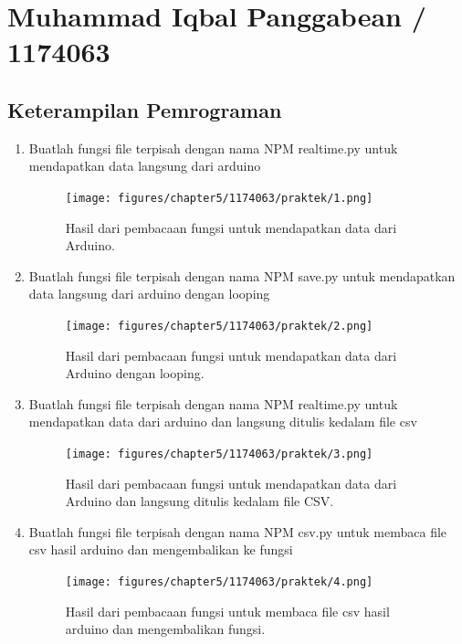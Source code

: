 \section{Muhammad Iqbal Panggabean / 1174063}
\subsection{Keterampilan Pemrograman}
\begin{enumerate}
	\item Buatlah fungsi file terpisah dengan nama NPM realtime.py untuk mendapatkan data langsung dari arduino
	

	\begin{figure}[H]
		\texttt{[image: figures/chapter5/1174063/praktek/1.png]}
		\centering
		\caption{Hasil dari pembacaan fungsi untuk mendapatkan data dari Arduino.}
	\end{figure}
	
	\item Buatlah fungsi file terpisah dengan nama NPM save.py untuk mendapatkan data langsung dari arduino dengan looping
	

	\begin{figure}[H]
		\texttt{[image: figures/chapter5/1174063/praktek/2.png]}
		\centering
		\caption{Hasil dari pembacaan fungsi untuk mendapatkan data dari Arduino dengan looping.}
	\end{figure}
	
	\item Buatlah fungsi file terpisah dengan nama NPM realtime.py untuk mendapatkan data dari arduino dan langsung ditulis kedalam file csv
	

	\begin{figure}[H]
		\texttt{[image: figures/chapter5/1174063/praktek/3.png]}
		\centering
		\caption{Hasil dari pembacaan fungsi untuk mendapatkan data dari Arduino dan langsung ditulis kedalam file CSV.}
	\end{figure}
	
	\item Buatlah fungsi file terpisah dengan nama NPM csv.py untuk membaca file csv hasil arduino dan mengembalikan ke fungsi
	

	\begin{figure}[H]
		\texttt{[image: figures/chapter5/1174063/praktek/4.png]}
		\centering
		\caption{Hasil dari pembacaan fungsi untuk membaca file csv hasil arduino dan mengembalikan fungsi.}
	\end{figure}
	
\end{enumerate}

